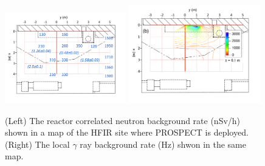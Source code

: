 \begin{figure}
    \centering
    \includegraphics[width=0.47\textwidth, valign=t]{Figures/NeutronBGMap.pdf}
    \includegraphics[width=0.51\textwidth, valign=t]{Figures/GammaBGMap.pdf}
    \caption[Local background distribution at HFIR facility]{(Left) The reactor correlated neutron background rate (nSv/h) shown in a map of the HFIR site where PROSPECT is deployed.
    (Right) The local $\gamma$ ray background rate (Hz) shwon in the same map.
    }
    \label{fig:prospect_background}
\end{figure}



